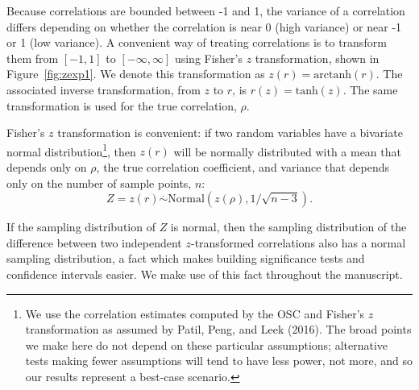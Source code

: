 \documentclass[doc,a4paper,floatsintext,draftfirst]{apa6}
\begin{document}
Because correlations are bounded between -1 and 1, the variance of a correlation differs depending on whether the correlation is near 0 (high variance) or near -1 or 1 (low variance). A convenient way of treating correlations is to transform them from $[-1,1]$ to $[-\infty,\infty]$ using Fisher's $z$ transformation, shown in Figure~\ref{fig:zexp1}. We denote this transformation as $z(r)=\mbox{arctanh}(r)$. The associated inverse transformation, from $z$ to $r$, is $r(z)=\mbox{tanh}(z)$. The same transformation is used for the true correlation, $\rho$.

Fisher's $z$ transformation is convenient: if two random variables have a bivariate normal distribution\footnote{We use the correlation estimates computed by the OSC and Fisher's $z$ transformation as assumed by Patil, Peng, and Leek (2016). The broad points we make here do not depend on these particular assumptions; alternative tests making fewer assumptions will tend to have less power, not more, and so our results represent a best-case scenario.}, then $z(r)$ will be normally distributed with a mean that depends only on $\rho$, the true correlation coefficient, and variance that depends only on the number of sample points, $n$:
\[
Z = z(r) \stackrel{.}{\sim} \mbox{Normal}\left(z\left(\rho\right), 1/\sqrt{n-3} \right). 
\]

\nocite{Patil:etal:2016}

If the sampling distribution of $Z$ is normal, then the sampling distribution of the difference between two independent $z$-transformed correlations also has a normal sampling distribution, a fact which makes building significance tests and confidence intervals easier. We make use of this fact throughout the manuscript.
\end{document}
